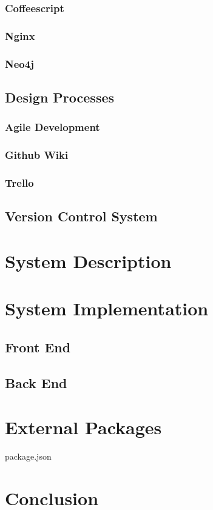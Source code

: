 \documentclass[a4wide, 11pt]{article}
\begin{document}
\subsubsection {Coffeescript}
\subsubsection {Nginx}
\subsubsection {Neo4j}

\subsection {Design Processes}

\subsubsection {Agile Development}
\subsubsection {Github Wiki}
\subsubsection {Trello}

\subsection {Version Control System}

\section {System Description}

\section {System Implementation}
\subsection {Front End}
\subsection {Back End}

\section {External Packages}

package.json

\section {Conclusion}
\end{document}
